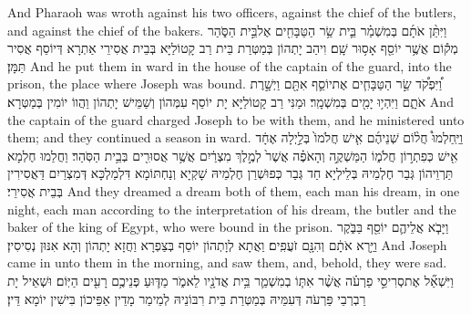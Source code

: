 {And Pharaoh was wroth against his two officers, against the chief of the butlers, and against the chief of the bakers.}{}
{וַיִּתֵּ֨ן אֹתָ֜ם בְּמִשְׁמַ֗ר בֵּ֛ית שַׂ֥ר הַטַּבָּחִ֖ים אֶל\maqqaf בֵּ֣ית הַסֹּ֑הַר מְק֕וֹם אֲשֶׁ֥ר יוֹסֵ֖ף אָס֥וּר שָֽׁם׃}
{וִיהַב יָתְהוֹן בְּמַטְּרַת בֵּית רַב קָטוֹלַיָּא בְּבֵית אֲסִירֵי אַתְרָא דְּיוֹסֵף אֲסִיר תַּמָּן׃}
{And he put them in ward in the house of the captain of the guard, into the prison, the place where Joseph was bound.}{}
{וַ֠יִּפְקֹ֠ד שַׂ֣ר הַטַּבָּחִ֧ים אֶת\maqqaf יוֹסֵ֛ף אִתָּ֖ם וַיְשָׁ֣רֶת אֹתָ֑ם וַיִּהְי֥וּ יָמִ֖ים בְּמִשְׁמָֽר׃}
{וּמַנִּי רַב קָטוֹלַיָּא יָת יוֹסֵף עִמְּהוֹן וְשַׁמֵּישׁ יָתְהוֹן וַהֲווֹ יוֹמִין בְּמַטְּרָא׃}
{And the captain of the guard charged Joseph to be with them, and he ministered unto them; and they continued a season in ward.}{}
{וַיַּֽחַלְמוּ֩ חֲל֨וֹם שְׁנֵיהֶ֜ם אִ֤ישׁ חֲלֹמוֹ֙ בְּלַ֣יְלָה אֶחָ֔ד אִ֖ישׁ כְּפִתְר֣וֹן חֲלֹמ֑וֹ הַמַּשְׁקֶ֣ה וְהָאֹפֶ֗ה אֲשֶׁר֙ לְמֶ֣לֶךְ מִצְרַ֔יִם אֲשֶׁ֥ר אֲסוּרִ֖ים בְּבֵ֥ית הַסֹּֽהַר׃}
{וַחֲלַמוּ חֶלְמָא תַּרְוֵיהוֹן גְּבַר חֶלְמֵיהּ בְּלֵילְיָא חַד גְּבַר כְּפוּשְׁרַן חֶלְמֵיהּ שָׁקְיָא וְנַחְתּוֹמָא דִּלְמַלְכָּא דְּמִצְרַיִם דַּאֲסִירִין בְּבֵית אֲסִירֵי׃}
{And they dreamed a dream both of them, each man his dream, in one night, each man according to the interpretation of his dream, the butler and the baker of the king of Egypt, who were bound in the prison.}{}
{וַיָּבֹ֧א אֲלֵיהֶ֛ם יוֹסֵ֖ף בַּבֹּ֑קֶר וַיַּ֣רְא אֹתָ֔ם וְהִנָּ֖ם זֹעֲפִֽים׃}
{וַאֲתָא לְוָתְהוֹן יוֹסֵף בְּצַפְרָא וַחֲזָא יָתְהוֹן וְהָא אִנּוּן נְסִיסִין׃}
{And Joseph came in unto them in the morning, and saw them, and, behold, they were sad.}{}
{וַיִּשְׁאַ֞ל אֶת\maqqaf סְרִיסֵ֣י פַרְעֹ֗ה אֲשֶׁ֨ר אִתּ֧וֹ בְמִשְׁמַ֛ר בֵּ֥ית אֲדֹנָ֖יו לֵאמֹ֑ר מַדּ֛וּעַ פְּנֵיכֶ֥ם רָעִ֖ים הַיּֽוֹם׃}
{וּשְׁאֵיל יָת רַבְרְבֵי פַּרְעֹה דְּעִמֵּיהּ בְּמַטְּרַת בֵּית רִבּוֹנֵיהּ לְמֵימַר מָדֵין אַפֵּיכוֹן בִּישִׁין יוֹמָא דֵּין׃}
